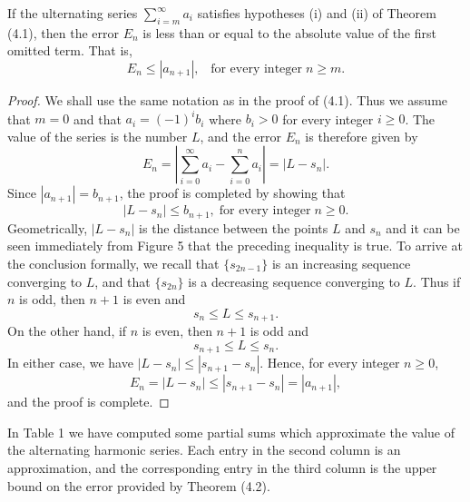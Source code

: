 \begin{theorem}  %
If the ulternating series $\sum_{i=m}^{\infty} a_i$ satisfies hypotheses (i) and (ii) of Theorem (4.1), then the error $E_n$ is less than or equal to the absolute value of the first omitted term. That is,
$$
E_n \leq |a_{n+1}|,  \;\;\; \mbox{for every integer} \; n \geq m.
$$
\end{theorem}

\begin{proof}
We shall use the same notation as in the proof of (4.1). Thus we assume that $ m = 0$ and that $a_i = (-1)^{i} b_i$ where $b_i > 0$ for every integer $i \geq 0$. The value of the series is the number $L$, and the error $E_n$ is therefore given by
$$
E_n = | \sum_{i=0}^{\infty} a_i - \sum_{i=0}^{n}  a_i | = |L - s_n| .
$$
Since $|a_{n+1}| = b_{n+1}$, the proof is completed by showing that
$$
|L - s_n| \leq b_{n+1}, \; \mbox{for every integer}\; n \geq 0.
$$
Geometrically, $|L - s_n|$ is the distance between the points $L$ and $s_n$ and it can be seen immediately from Figure 5 that the preceding inequality is true. To arrive at the conclusion formally, we recall that $\{s_{2n-1} \}$ is an increasing sequence converging to $L$, and that $\{s_{2n} \}$ is a decreasing sequence converging to $L$. Thus if $n$ is odd, then $n + 1$ is even and
$$
s_n \leq L \leq s_{n+1}.
$$
On the other hand, if $n$ is even, then $n + 1$ is odd and
$$
s_{n +1} \leq L \leq s_n.
$$
In either case, we have $|L - s_n| \leq |s_{n+1} - s_n|$. Hence, for every integer $n \geq 0$, 
$$
E_n = |L - s_n| \leq |s_{n+1} - s_n| = |a_{n+1}|,
$$
and the proof is complete.
\end{proof}

In Table 1 we have computed some partial sums which approximate the value of the alternating harmonic series. Each entry in the second column is an approximation, and the corresponding entry in the third column is the upper bound on the error provided by Theorem (4.2).

